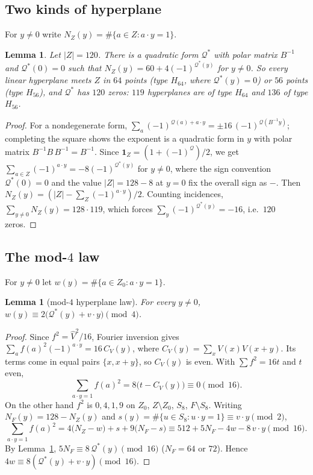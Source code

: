 \documentclass[11pt]{article}
\newtheorem{lemma}[theorem]{Lemma}
\theoremstyle{definition}
\theoremstyle{remark}
\newcommand{\ind}{\mathbf{1}}
\DeclareRobustCommand{\_}{\textunderscore\allowbreak}
\begin{document}
\subsection{Two kinds of hyperplane}

For $y\ne0$ write $N_Z(y)=\#\{a\in Z:a\cdot y=1\}$.

\begin{lemma}\label{lem:hyper}
Let $|Z|=120$. There is a quadratic form $\mathcal Q^*$ with polar matrix $B^{-1}$ and $\mathcal Q^*(0)=0$ such that $N_Z(y)=60+4(-1)^{\mathcal Q^*(y)}$ for $y\neq0$. So every linear hyperplane meets $Z$ in $64$ points (type $H_{64}$, where $\mathcal Q^*(y)=0$) or $56$ points (type $H_{56}$), and $\mathcal Q^*$ has $120$ zeros: $119$ hyperplanes are of type $H_{64}$ and $136$ of type $H_{56}$.
\end{lemma}

\begin{proof}
For a nondegenerate form, $\sum_a(-1)^{\mathcal Q(a)+a\cdot y}=\pm16\,(-1)^{\mathcal Q(B^{-1}y)}$; completing the square shows the exponent is a quadratic form in $y$ with polar matrix $B^{-1}B\,B^{-1}=B^{-1}$. Since $\ind_Z=(1+(-1)^{\mathcal Q})/2$, we get $\sum_{a\in Z}(-1)^{a\cdot y}=-8(-1)^{\mathcal Q^*(y)}$ for $y\ne0$, where the sign convention $\mathcal Q^*(0)=0$ and the value $|Z|=128-8$ at $y=0$ fix the overall sign as $-$. Then $N_Z(y)=(|Z|-\sum_Z(-1)^{a\cdot y})/2$. Counting incidences, $\sum_{y\ne0}N_Z(y)=128\cdot119$, which forces $\sum_y(-1)^{\mathcal Q^*(y)}=-16$, i.e.\ $120$ zeros.
\end{proof}

\subsection{The mod-$4$ law}

For $y\ne0$ let $w(y)=\#\{a\in Z_0:a\cdot y=1\}$.

\begin{lemma}[mod-$4$ hyperplane law]\label{lem:mod4}
For every $y\ne0$, $w(y)\equiv 2\big(\mathcal Q^*(y)+v\cdot y\big)\pmod 4$.
\end{lemma}

\begin{proof}
Since $f^2=\widehat V^2/16$, Fourier inversion gives $\sum_a f(a)^2(-1)^{a\cdot y}=16\,C_V(y)$, where $C_V(y)=\sum_xV(x)V(x+y)$. Its terms come in equal pairs $\{x,x+y\}$, so $C_V(y)$ is even. With $\sum f^2=16t$ and $t$ even,
\[
  \sum_{a\cdot y=1}f(a)^2 = 8\big(t-C_V(y)\big)\equiv 0\pmod{16}.
\]
On the other hand $f^2$ is $0,4,1,9$ on $Z_0$, $Z\setminus Z_0$, $S_8$, $F\setminus S_8$. Writing $N_F(y)=128-N_Z(y)$ and $s(y)=\#\{u\in S_8:u\cdot y=1\}\equiv v\cdot y\pmod 2$,
\[
  \sum_{a\cdot y=1}f(a)^2=4\big(N_Z-w\big)+s+9\big(N_F-s\big)\equiv 512+5N_F-4w-8\,v\cdot y\pmod{16}.
\]
By Lemma~\ref{lem:hyper}, $5N_F\equiv 8\,\mathcal Q^*(y)\pmod{16}$ ($N_F=64$ or $72$). Hence $4w\equiv 8(\mathcal Q^*(y)+v\cdot y)\pmod{16}$.
\end{proof}
\end{document}

